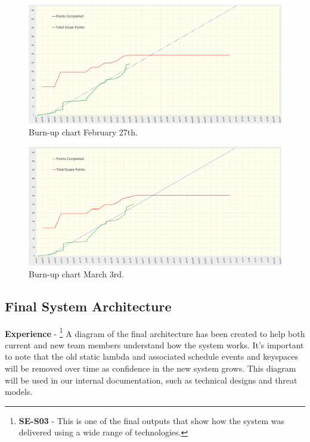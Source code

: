   \begin{figure}[H]
    \centering
    \includegraphics[width=12cm]{assets/outputs/burnups/02-27.png}
    \caption{Burn-up chart February 27th.}
    \label{fig:burnup5}
  \end{figure}

  \begin{figure}[H]
    \centering
    \includegraphics[width=12cm]{assets/outputs/burnups/03-03.png}
    \caption{Burn-up chart March 3rd.}
    \label{fig:burnup6}
  \end{figure}

  \newpage
  \subsection{Final System Architecture}

  \textbf{Experience} - 
  \footnote{\textbf{SE-S03} - This is one of the final outputs that show how the system was delivered using a wide range of technologies.}
  A diagram of the final architecture has been created to help both current and new team members understand how the system works.
  It's important to note that the old static lambda and associated schedule events and keyspaces will be removed over time as confidence in the new system 
  grows. This diagram will be used in our internal documentation, such as technical designs and threat models.

